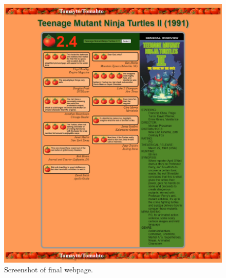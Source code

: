 \documentclass{article}
\begin{document}
\begin{figure}
  \includegraphics[width=\textwidth]{screencapture.png}
  \caption{Screenshot of final webpage.}
\label{screenshot}
\end{figure}
\end{document}
